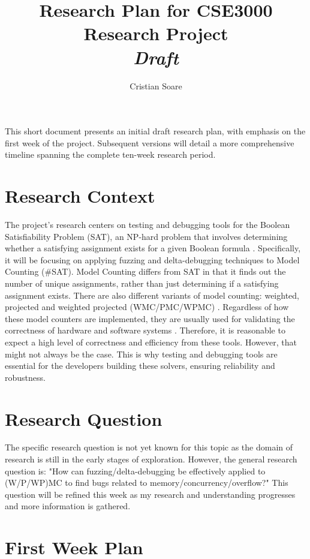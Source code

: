 \documentclass[english, a4paper]{article}
\title{
    Research Plan for CSE3000 Research Project\\
    {\Large \textit{Draft}}
}
\author{Cristian Soare}
\begin{document}
\maketitle

This short document presents an initial draft research plan, with emphasis on the first week of the project. Subsequent versions will detail a more comprehensive timeline spanning the complete ten-week research period.

\section*{Research Context}

The project's research centers on testing and debugging tools for the Boolean Satisfiability Problem (SAT), an NP-hard problem that involves determining whether a satisfying assignment exists for a given Boolean formula \parencite{Biere2009}. Specifically, it will be focusing on applying fuzzing and delta-debugging techniques to Model Counting (\#SAT). Model Counting differs from SAT in that it finds out the number of unique assignments, rather than just determining if a satisfying assignment exists. There are also different variants of model counting: weighted, projected and weighted projected (WMC/PMC/WPMC) \parencite{Biere2009}. Regardless of how these model counters are implemented, they are usually used for validating the correctness of hardware and software systems \parencite{Duenas2017,Latour2022,Baluta2019}. Therefore, it is reasonable to expect a high level of correctness and efficiency from these tools. However, that might not always be the case. This is why testing and debugging tools are essential for the developers building these solvers, ensuring reliability and robustness.

\section*{Research Question}

The specific research question is not yet known for this topic as the domain of research is still in the early stages of exploration. However, the general research question is: "How can fuzzing/delta-debugging be effectively applied to (W/P/WP)MC to find bugs related to memory/concurrency/overflow?" This question will be refined this week as my research and understanding progresses and more information is gathered.


\section*{First Week Plan}
\end{document}
